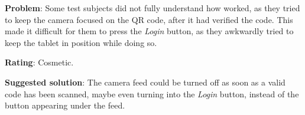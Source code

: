 \begin{description}
\item{\textbf{Problem}:} Some test subjects did not fully understand how \authenticationactivity worked, as they tried to keep the camera focused on the QR code, after it had verified the code. 
This made it difficult for them to press the \textit{Login} button, as they awkwardly tried to keep the tablet in position while doing so. 
\item{\textbf{Rating}:} Cosmetic.
\item{\textbf{Suggested solution}:} The camera feed could be turned off as soon as a valid code has been scanned, maybe even turning into the \textit{Login} button, instead of the button appearing under the feed. 
\end{description}